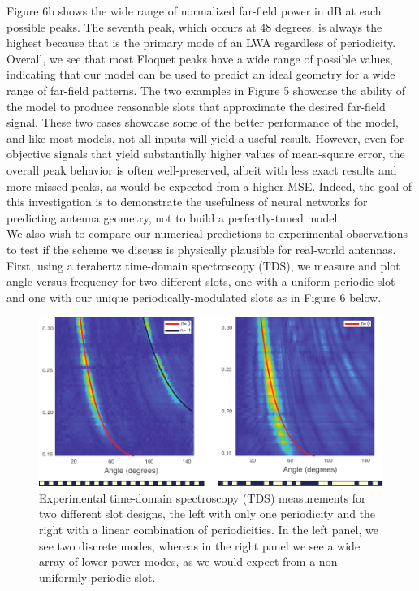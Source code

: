 \documentclass[11pt]{article}
\begin{document}
\noindent Figure 6b shows the wide range of normalized far-field power in dB at each possible peaks. The seventh peak, which occurs at 48 degrees, is always the highest because that is the primary mode of an LWA regardless of periodicity. Overall, we see that most Floquet peaks have a wide range of possible values, indicating that our model can be used to predict an ideal geometry for a wide range of far-field patterns. The two examples in Figure 5 showcase the ability of the model to produce reasonable slots that approximate the desired far-field signal. These two cases showcase some of the better performance of the model, and like most models, not all inputs will yield a useful result. However, even for objective signals that yield substantially higher values of mean-square error, the overall peak behavior is often well-preserved, albeit with less exact results and more missed peaks, as would be expected from a higher MSE. Indeed, the goal of this investigation is to demonstrate the usefulness of neural networks for predicting antenna geometry, not to build a perfectly-tuned model. \\

\noindent We also wish to compare our numerical predictions to experimental observations to test if the scheme we discuss is physically plausible for real-world antennas. First, using a terahertz time-domain spectroscopy (TDS), we measure and plot angle versus frequency for two different slots, one with a uniform periodic slot and one with our unique periodically-modulated slots as in Figure 6 below.

\begin{figure}[H]
	\centering
	\includegraphics{figures/exp-fig1pdf}
	\caption{Experimental time-domain spectroscopy (TDS) measurements for two different slot designs, the left with only one periodicity and the right with a linear combination of periodicities. In the left panel, we see two discrete modes, whereas in the right panel we see a wide array of lower-power modes, as we would expect from a non-uniformly periodic slot.}
\end{figure}
\end{document}
